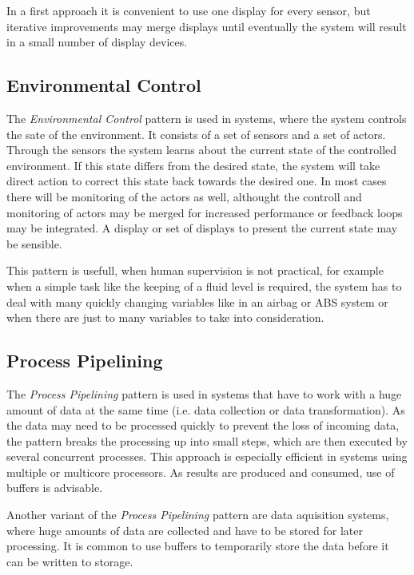 \documentclass[10pt,a4paper,titlepage,draft]{article} %
\begin{document}
In a first approach it is convenient to use one display for every sensor, but iterative improvements may merge displays until eventually the system will result in a small number of display devices.

\subsection{Environmental Control}
The \emph{Environmental Control} pattern is used in systems, where the system controls the sate of the environment.
It consists of a set of sensors and a set of actors.
Through the sensors the system learns about the current state of the controlled environment.
If this state differs from the desired state, the system will take direct action to correct this state back towards the desired one.
In most cases there will be monitoring of the actors as well, althought the controll and monitoring of actors may be merged for increased performance or feedback loops may be integrated.
A display or set of displays to present the current state may be sensible.

This pattern is usefull, when human supervision is not practical, for example when a simple task like the keeping of a fluid level is required, the system has to deal with many quickly changing variables like in an airbag or ABS system or when there are just to many variables to take into consideration.

\subsection{Process Pipelining}
The \emph{Process Pipelining} pattern is used in systems that have to work with a huge amount of data at the same time (i.e. data collection or data transformation).
As the data may need to be processed quickly to prevent the loss of incoming data, the pattern breaks the processing up into small steps, which are then executed by several concurrent processes.
This approach is especially efficient in systems using multiple or multicore processors.
As results are produced and consumed, use of buffers is advisable.

Another variant of the \emph{Process Pipelining} pattern are data aquisition systems, where huge amounts of data are collected and have to be stored for later processing.
It is common to use buffers to temporarily store the data before it can be written to storage.

\end{document}
